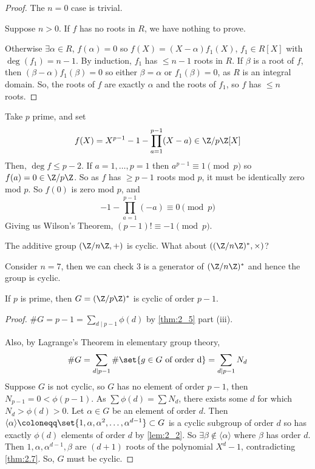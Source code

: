 \documentclass{article}
\begin{document}
\begin{proof}
    The $n=0$ case is trivial.

    Suppose $n > 0$. If $f$ has no roots in $R$, we have nothing to prove.

    Otherwise $\exists \alpha \in R$, $f(\alpha) = 0$ so $f(X) = (X - \alpha) f_1(X)$, $f_1 \in R[X]$ with $\deg(f_1) = n-1$.
    By induction, $f_1$ has $\leq n-1$ roots in $R$.
    If $\beta$ is a root of $f$, then $(\beta-\alpha) f_1(\beta) = 0$ so either $\beta = \alpha$ or $f_1(\beta) = 0$, as $R$ is an integral domain.
    So, the roots of $f$ are exactly $\alpha$ and the roots of $f_1$, so $f$ has $\leq n$ roots.
\end{proof}

\begin{eg}
    Take $p$ prime, and set
    \begin{equation*}f(X) = X^{p-1} - 1 - \prod_{a=1}^{p-1} (X - a) \in \Z / p \Z [X]\end{equation*}
    Then, $\deg f \leq p-2$. If $a=1, \dotsc, p=1$ then $a^{p-1} \equiv 1 \pmod{p}$ so $f(a) = 0 \in \Z/p\Z$.
    So as $f$ has $\geq p-1$ roots mod $p$, it must be identically zero mod $p$. So $f(0)$ is zero mod $p$, and
    \begin{equation*}
        -1 - \prod_{a=1}^{p-1} (-a) \equiv 0 \pmod{p}
    \end{equation*}
    Giving us Wilson's Theorem, $(p-1)! \equiv -1 \pmod{p}$.
\end{eg}

The additive group $(\Z / n\Z, +)$ is cyclic. What about $((\Z/n\Z)^*, \times)$?

\begin{eg}
    Consider $n=7$, then we can check $3$ is a generator of $(\Z / n \Z)^*$ and hence the group is cyclic.
\end{eg}

\begin{nthm}\label{thm:2.8}
    If $p$ is prime, then $G = (\Z / p \Z)^*$ is cyclic of order $p-1$.
\end{nthm}

\begin{proof}
    $\# G = p-1 = \sum_{d \mid p-1} \phi(d)$ by \cref{thm:2_5} part (iii).

    Also, by Lagrange's Theorem in elementary group theory, \begin{equation*}\# G = \sum_{d \mid p-1} \# \set{g \in G \ \text{of order d}} = \sum_{d \mid p-1} N_d\end{equation*}
    Suppose $G$ is not cyclic, so $G$ has no element of order $p-1$, then ${N_{p-1} = 0 < \phi(p-1)}$.
    As $\sum \phi(d) = \sum N_d$, there exists some $d$ for which $N_d > \phi(d) > 0$. Let $\alpha \in G$ be an element of order $d$.
    Then $\langle\alpha\rangle \coloneqq \set{1, \alpha, \alpha^2, \dotsc, \alpha^{d-1}} \subset G$ is a cyclic subgroup of order $d$ so has exactly $\phi(d)$ elements of order $d$ by \cref{lem:2_2}.
    So $\exists \beta \notin \langle\alpha\rangle$ where $\beta$ has order $d$.
    Then $1, \alpha, \alpha^{d-1}, \beta$ are $(d+1)$ roots of the polynomial $X^d - 1$, contradicting \cref{thm:2.7}.
    So, $G$ must be cyclic.
\end{proof}
\end{document}

